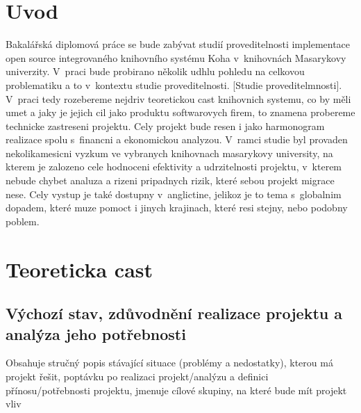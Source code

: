 \documentclass[
	12pt, oneside, printed, final, 
	table,   %
	lof,     %
	lot     %
]{fithesis3}
\begin{document}
{\fontsize{12}{18}

\chapter{Uvod}

Bakalářská diplomová práce se bude zabývat studií proveditelnosti implementace 
open source integrovaného knihovního systému Koha v~knihovnách Masarykovy univerzity. V~praci bude probirano několik udhlu pohledu na celkovou problematiku a to v~kontextu studie proveditelnosti. [Studie proveditelmnosti]. V~praci tedy rozebereme nejdriv teoretickou cast knihovnich systemu, co by měli umet a jaky je jejich cil jako produktu softwarovych firem, to znamena probereme technicke zastreseni projektu. Cely projekt bude resen i jako harmonogram realizace spolu s~financni a ekonomickou analyzou. V~ramci studie byl provaden nekolikamesicni vyzkum ve vybranych knihovnach masarykovy university, na kterem je zalozeno cele hodnoceni efektivity a udrzitelnosti projektu, v~kterem nebude chybet analuza a rizeni pripadnych rizik, které sebou projekt  migrace nese. Cely vystup je také dostupny v~anglictine, jelikoz je to tema s~globalnim dopadem, které muze pomoct i jinych krajinach, které resi stejny, nebo podobny poblem.

\chapter{Teoreticka cast }

\section{Výchozí stav, zdůvodnění realizace projektu a analýza jeho potřebnosti}

Obsahuje stručný popis stávající situace (problémy a nedostatky), kterou má projekt
řešit, poptávku po realizaci projekt/analýzu a definici přínosu/potřebnosti projektu,
jmenuje cílové skupiny, na které bude mít projekt vliv

}
\end{document}
